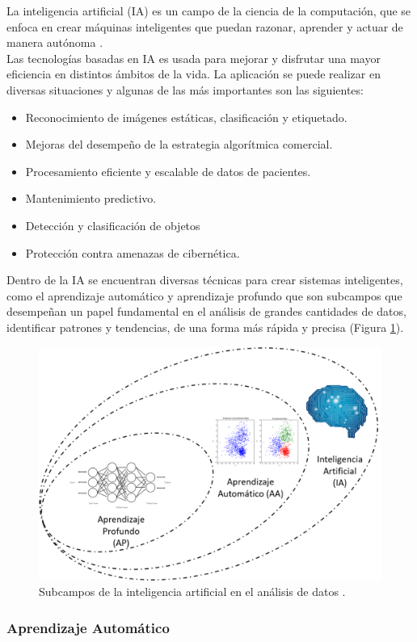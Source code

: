 La inteligencia artificial (IA) es un campo de la ciencia de la computación, que se enfoca en crear máquinas inteligentes que puedan razonar, aprender y actuar de manera autónoma \citep{rouhiainen2018inteligencia}.\\

Las tecnologías basadas en IA es usada para mejorar y disfrutar una mayor eficiencia en distintos ámbitos de la vida. La aplicación se puede realizar en diversas situaciones y algunas de las más importantes son las siguientes:

\begin{itemize}
    \item Reconocimiento de imágenes estáticas, clasificación y etiquetado.
    \item Mejoras del desempeño de la estrategia algorítmica comercial.
    \item Procesamiento eficiente y escalable de datos de pacientes.
    \item Mantenimiento predictivo.
    \item Detección y clasificación de objetos
    \item Protección contra amenazas de cibernética.
\end{itemize}

Dentro de la IA se encuentran diversas técnicas para crear sistemas inteligentes, como el aprendizaje automático y aprendizaje profundo que son subcampos que desempeñan un papel fundamental en el análisis de grandes cantidades de datos, identificar patrones y tendencias, de una forma más rápida y precisa (Figura \ref{fig:IA_AA_A}).

  \begin{figure}[!h]
     \centering
     \includegraphics[width=.5\textwidth]{Imagenes/IA_AA_AP.png}
     \caption{Subcampos de la inteligencia artificial en el análisis de datos .}
     \label{fig:IA_AA_A}
 \end{figure}


\subsubsection{Aprendizaje Automático}

